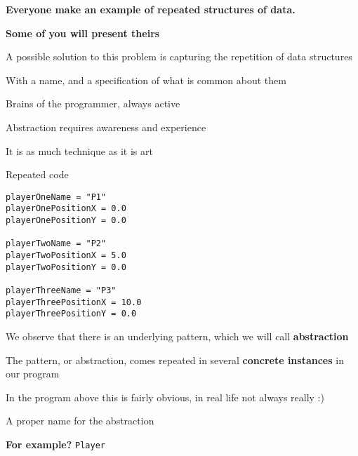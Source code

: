 \documentclass{beamer}
\begin{document}
\begin{slide}{
\item \textbf{Everyone make an example of repeated structures of data.}
\item \textbf{Some of you will present theirs}
}\end{slide}

\begin{slide}{
\item A possible solution to this problem is capturing the repetition of data structures
\item With a name, and a specification of what is common about them
}\end{slide}

\begin{slide}{
\item Brains of the programmer, always active
\item Abstraction requires awareness and experience
\item It is as much technique as it is art
}\end{slide}

\begin{frame}[fragile]{Repeated code}
\begin{lstlisting}
playerOneName = "P1"
playerOnePositionX = 0.0
playerOnePositionY = 0.0

playerTwoName = "P2"
playerTwoPositionX = 5.0
playerTwoPositionY = 0.0

playerThreeName = "P3"
playerThreePositionX = 10.0
playerThreePositionY = 0.0
\end{lstlisting}
\end{frame}

\begin{slide}{
\item We observe that there is an underlying pattern, which we will call \textbf{abstraction}
\item The pattern, or abstraction, comes repeated in several \textbf{concrete instances} in our program
\pause
\item In the program above this is fairly obvious, in real life not always really :)
}\end{slide}

\begin{slide}{
\item A proper name for the abstraction
\item \textbf{For example?} \pause \texttt{Player}
}\end{slide}
\end{document}

